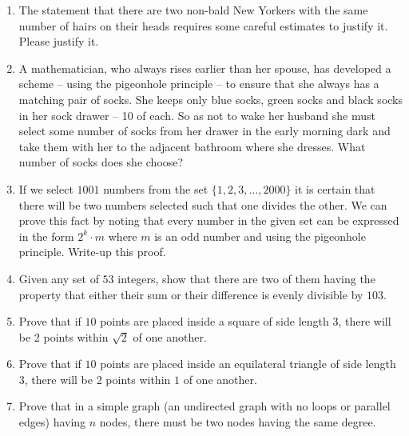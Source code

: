 \begin{enumerate}

\item The statement that there are two non-bald New Yorkers with
the same number of hairs on their heads requires some careful 
estimates to justify it.  Please justify it.

\item A mathematician, who always rises earlier than her spouse, has
developed a scheme -- using the pigeonhole principle -- to ensure that
she always has a matching pair of socks.  She keeps only blue socks, green 
socks and
black socks in her sock drawer -- 10 of each.  So as not to wake her 
husband she must
select some number of socks from her drawer in the early morning dark
and take them with her to the adjacent bathroom where she dresses.
What number of socks does she choose?

\item If we select $1001$ numbers from the set $\{1, 2, 3, \ldots, 2000\}$
it is certain that there will be two numbers selected such that one divides
the other.  We can prove this fact by noting that every number in the given
set can be expressed in the form $2^k \cdot m$ where $m$ is an odd number
and using the pigeonhole principle.  Write-up this proof.

\item Given any set of $53$ integers, show that there are two of them
having the property 
that either their sum or their difference is evenly divisible by $103$.

\item Prove that if $10$ points are placed inside a square of side length 3,
there will be 2 points within $\sqrt{2}$ of one another.

\item Prove that if $10$ points are placed inside an equilateral triangle
of side length 3, there will be 2 points within $1$ of one another.

\item Prove that in a simple graph (an undirected graph with no 
loops or parallel edges) having $n$ nodes, there must be two nodes 
having the same degree. 

\end{enumerate}



